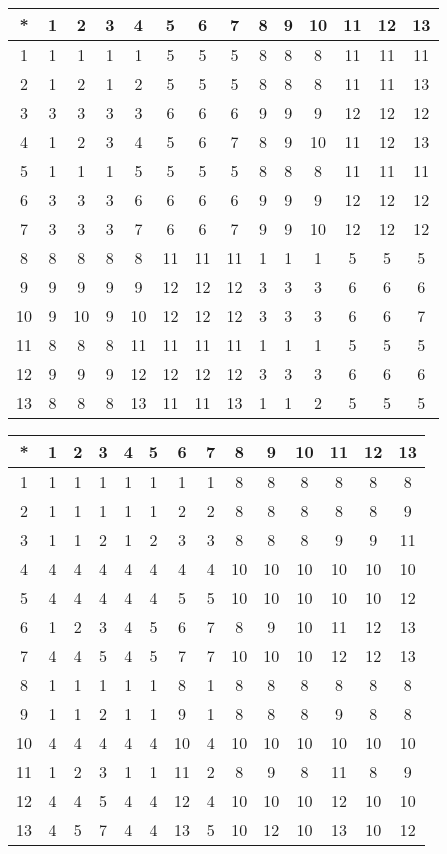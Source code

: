\begin{tabular}[t]{c|ccccccccccccc}
*&1&2&3&4&5&6&7&8&9&10&11&12&13 \\ \hline
    1&1&1&1&1&5&5&5&8&8&8&11&11&11 \\
    2&1&2&1&2&5&5&5&8&8&8&11&11&13 \\
    3&3&3&3&3&6&6&6&9&9&9&12&12&12 \\
    4&1&2&3&4&5&6&7&8&9&10&11&12&13 \\
    5&1&1&1&5&5&5&5&8&8&8&11&11&11 \\
    6&3&3&3&6&6&6&6&9&9&9&12&12&12 \\
    7&3&3&3&7&6&6&7&9&9&10&12&12&12 \\
    8&8&8&8&8&11&11&11&1&1&1&5&5&5 \\
    9&9&9&9&9&12&12&12&3&3&3&6&6&6 \\
    10&9&10&9&10&12&12&12&3&3&3&6&6&7 \\
    11&8&8&8&11&11&11&11&1&1&1&5&5&5 \\
    12&9&9&9&12&12&12&12&3&3&3&6&6&6 \\
    13&8&8&8&13&11&11&13&1&1&2&5&5&5 
\end{tabular}


\begin{tabular}[t]{c|ccccccccccccc}
*&1&2&3&4&5&6&7&8&9&10&11&12&13 \\ \hline
    1&1&1&1&1&1&1&1&8&8&8&8&8&8 \\
    2&1&1&1&1&1&2&2&8&8&8&8&8&9 \\
    3&1&1&2&1&2&3&3&8&8&8&9&9&11 \\
    4&4&4&4&4&4&4&4&10&10&10&10&10&10 \\
    5&4&4&4&4&4&5&5&10&10&10&10&10&12 \\
    6&1&2&3&4&5&6&7&8&9&10&11&12&13 \\
    7&4&4&5&4&5&7&7&10&10&10&12&12&13 \\
    8&1&1&1&1&1&8&1&8&8&8&8&8&8 \\
    9&1&1&2&1&1&9&1&8&8&8&9&8&8 \\
    10&4&4&4&4&4&10&4&10&10&10&10&10&10 \\
    11&1&2&3&1&1&11&2&8&9&8&11&8&9 \\
    12&4&4&5&4&4&12&4&10&10&10&12&10&10 \\
    13&4&5&7&4&4&13&5&10&12&10&13&10&12 
\end{tabular}


